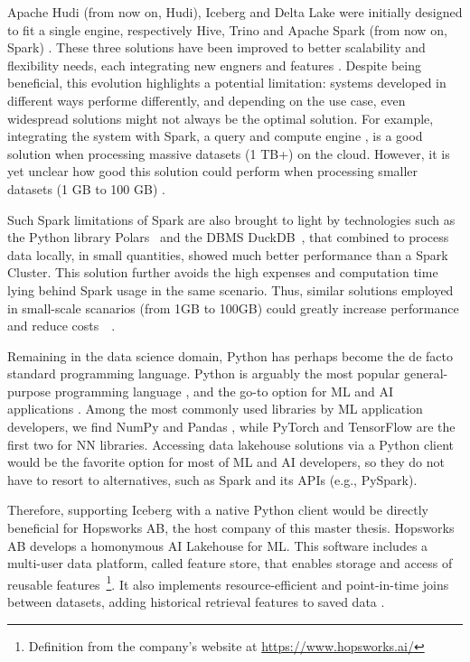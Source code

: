 Apache Hudi (from now on, Hudi), Iceberg and Delta Lake were initially designed to fit a single engine, respectively Hive, Trino and Apache Spark (from now on, Spark) \cite{ApacheHudiVs}. These three solutions have been improved to better scalability and flexibility needs, each integrating new engners and features \cite{OngoingEvolutionTableFormat}. Despite being beneficial, this evolution highlights a potential limitation: systems developed in different ways performe differently, and depending on the use case, even widespread solutions might not always be the optimal solution. For example, integrating the system with Spark, a query and compute engine \cite{zahariaApacheSparkUnified2016}, is a good solution when processing massive datasets (1 TB+) on the cloud. However, it is yet unclear how good this solution could perform when processing smaller datasets (1 GB to 100 GB) \cite{Khazanchi1801362}. 

Such Spark limitations of Spark are also brought to light by technologies such as the Python library Polars~\cite{vinkWroteOneFastest2021} and the \gls{DBMS} DuckDB~\cite{raasveldtDuckDBEmbeddableAnalytical2019}, that combined to process data locally, in small quantities, showed much better performance than a Spark Cluster. This solution further avoids the high expenses and computation time lying behind Spark usage in the same scenario. Thus, similar solutions employed in small-scale scanarios (from 1GB to 100GB) could greatly increase performance and reduce costs~\cite{ebergenUpdatesH2OAi2023}~\cite{BenchmarkResultsSpark}.

Remaining in the data science domain, Python has perhaps become the de facto standard programming language. Python is arguably the most popular general-purpose programming language \cite{TIOBEIndex, StackOverflowDeveloper, PythonTopLanguage}, and the go-to option for \gls{ML} and \gls{AI} applications \cite{python-machine-learning}. Among the most commonly used libraries by \gls{ML} application developers, we find NumPy and Pandas \cite{StackOverflowDeveloper}, while PyTorch and TensorFlow are the first two for \gls{NN} libraries. Accessing data lakehouse solutions via a Python client would be the favorite option for most of \gls{ML} and \gls{AI} developers, so they do not have to resort to alternatives, such as Spark and its \glspl{API} (e.g., PySpark). 

Therefore, supporting Iceberg with a native Python client would be directly beneficial for Hopsworks AB, the host company of this master thesis. Hopsworks AB develops a homonymous \gls{AI} Lakehouse for \gls{ML}. This software includes a multi-user data platform, called feature store, that enables storage and access of reusable features~\footnote{Definition from the company's website at \url{https://www.hopsworks.ai/}}. It also implements resource-efficient and point-in-time joins between datasets, adding historical retrieval features to saved data \cite{Pettersson1695672}.

